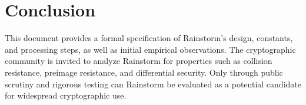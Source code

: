 \documentclass[11pt,a4paper]{article}
\begin{document}
\section*{Conclusion}
This document provides a formal specification of Rainstorm’s design, constants, and processing steps, as well as initial empirical observations. The cryptographic community is invited to analyze Rainstorm for properties such as collision resistance, preimage resistance, and differential security. Only through public scrutiny and rigorous testing can Rainstorm be evaluated as a potential candidate for widespread cryptographic use.
\end{document}
